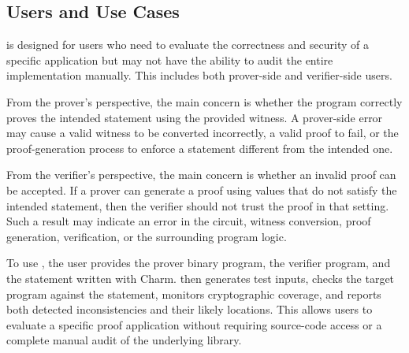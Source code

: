 \subsection{Users and Use Cases}
\label{subsec:greybox-users_use_cases}

\greyboxfuzz is designed for users who need to evaluate the correctness and security of a specific \zksnark application but may not have the ability to audit the entire implementation manually. This includes both prover-side and verifier-side users.

From the prover's perspective, the main concern is whether the program correctly proves the intended statement using the provided witness. A prover-side error may cause a valid witness to be converted incorrectly, a valid proof to fail, or the proof-generation process to enforce a statement different from the intended one.

From the verifier's perspective, the main concern is whether an invalid proof can be accepted. If a prover can generate a proof using values that do not satisfy the intended statement, then the verifier should not trust the proof in that setting. Such a result may indicate an error in the circuit, witness conversion, proof generation, verification, or the surrounding program logic.

To use \greyboxfuzz, the user provides the prover binary program, the verifier program, and the \zksnark statement written with Charm. \greyboxfuzz then generates test inputs, checks the target program against the statement, monitors cryptographic coverage, and reports both detected inconsistencies and their likely locations. This allows users to evaluate a specific proof application without requiring source-code access or a complete manual audit of the underlying \zksnark library.


